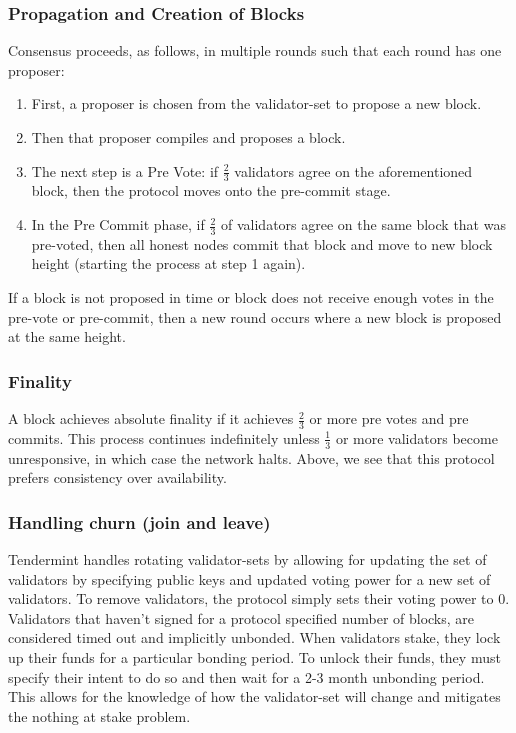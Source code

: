 \documentclass[10pt,journal,compsoc]{IEEEtran}
\begin{document}
\subsubsection{Propagation and Creation of Blocks}
Consensus proceeds, as follows, in multiple rounds such that each round has one proposer:
\begin{enumerate}
    \item First, a proposer is chosen from the validator-set to propose a new block.
    \item Then that proposer compiles and proposes a block.
    \item The next step is a Pre Vote: if \(\frac{2}{3}\) validators agree on the aforementioned block, then the protocol moves onto the pre-commit stage.
    \item In the Pre Commit phase, if \(\frac{2}{3}\) of validators agree on the same block that was pre-voted, then all honest nodes commit that block and move to new block height (starting the process at step 1 again).
\end{enumerate}
If a block is not proposed in time or block does not receive enough votes in the pre-vote or pre-commit, then a new round occurs where a new block is proposed at the same height.

\subsubsection{Finality}
A block achieves absolute finality if it achieves \(\frac{2}{3}\) or more pre votes and pre commits. This process continues indefinitely unless \(\frac{1}{3}\) or more validators become unresponsive, in which case the network halts. Above, we see that this protocol prefers consistency over availability.

\subsubsection{Handling churn (join and leave)}
Tendermint handles rotating validator-sets by allowing for updating the set of validators by specifying public keys and updated voting power for a new set of validators. To remove validators, the protocol simply sets their voting power to 0. Validators that haven't signed for a protocol specified number of blocks, are considered timed out and implicitly unbonded. When validators stake, they lock up their funds for a particular bonding period. To unlock their funds, they must specify their intent to do so and then wait for a 2-3 month unbonding period. This allows for the knowledge of how the validator-set will change and mitigates the nothing at stake problem. 
\end{document}
